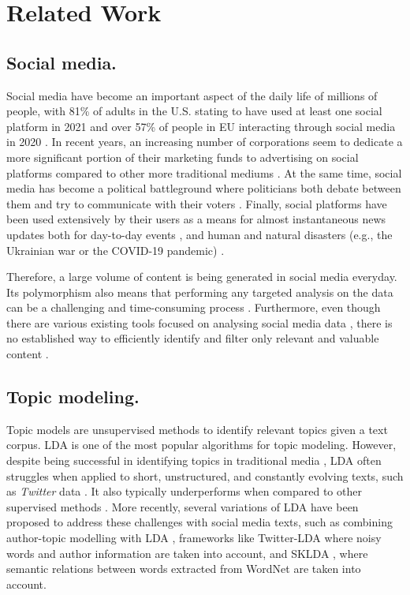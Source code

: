 \section{Related Work}
\subsection{Social media.}
Social media have become an important aspect of the daily life of millions of people, with 81\% of adults in the U.S. stating to have used at least one social platform 
in 2021 \cite{auxier2021social} and over 57\% of people in EU interacting through social media in 2020 \cite{eurostat}. In recent years, an increasing number of corporations seem to dedicate a more significant portion of their marketing funds to advertising on social platforms compared to other more traditional mediums \cite{eid2020internet}. At the same time, social media has become a political battleground where politicians both debate between them and try to communicate with their voters \cite{stier2018election, llewellyn2016brexit}. Finally, social platforms have been used extensively by their users as a means for almost instantaneous news updates both for day-to-day events \cite{hermida2012social}, and human and natural disasters (e.g., the Ukrainian war or the COVID-19 pandemic) \cite{khaldarova2016fake, banda2021large}.

Therefore, a large volume of content is being generated in social media everyday.  
Its polymorphism also means that performing any targeted analysis on the data can be a challenging and time-consuming process \cite{weller2015accepting, stieglitz2018social}. Furthermore, even though there are various existing tools focused on analysing social media data \cite{batrinca2015social}, there is no established way to efficiently identify and filter only relevant and valuable content \cite{nugroho2020survey}. 

\subsection{Topic modeling.} Topic models are unsupervised methods to identify relevant topics given a text corpus. \ac{LDA} \cite{lda} is one of the most popular algorithms for topic modeling. However, despite being successful in identifying topics in traditional media \cite{martin2015more, el2021end}, \ac{LDA} often struggles when applied to short, unstructured, and constantly evolving texts, such as \textit{Twitter} data \cite{zhao2011comparing}. It also typically underperforms when compared to other supervised methods \cite{arias2015ieee}. More recently, several variations of \ac{LDA} have been proposed to address these challenges with social media texts, such as combining author-topic modelling with \ac{LDA} \cite{rosen2004author,steinskog-etal-2017-twitter}, frameworks like Twitter-LDA \cite{zhao2011comparing} where noisy words and author information are taken into account, and SKLDA \cite{tajbakhsh2019semantic}, where semantic relations between words extracted from WordNet are taken into account.

